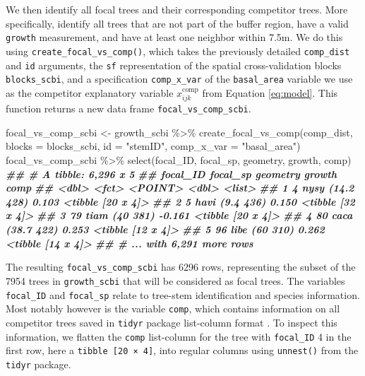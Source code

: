 \documentclass[12pt]{article}
\newenvironment{Shaded}{\begin{snugshade}}{\end{snugshade}}
\newcommand{\AttributeTok}[1]{\textcolor[rgb]{0.77,0.63,0.00}{#1}}
\newcommand{\DocumentationTok}[1]{\textcolor[rgb]{0.56,0.35,0.01}{\textbf{\textit{#1}}}}
\newcommand{\FunctionTok}[1]{\textcolor[rgb]{0.00,0.00,0.00}{#1}}
\newcommand{\NormalTok}[1]{#1}
\newcommand{\OtherTok}[1]{\textcolor[rgb]{0.56,0.35,0.01}{#1}}
\newcommand{\SpecialCharTok}[1]{\textcolor[rgb]{0.00,0.00,0.00}{#1}}
\newcommand{\StringTok}[1]{\textcolor[rgb]{0.31,0.60,0.02}{#1}}
\begin{document}
We then identify all focal trees and their corresponding competitor
trees. More specifically, identify all trees that are not part of the
buffer region, have a valid \texttt{growth} measurement, and have at
least one neighbor within 7.5m. We do this using
\texttt{create\_focal\_vs\_comp()}, which takes the previously detailed
\texttt{comp\_dist} and \texttt{id} arguments, the \texttt{sf}
representation of the spatial cross-validation blocks
\texttt{blocks\_scbi}, and a specification \texttt{comp\_x\_var} of the
\texttt{basal\_area} variable we use as the competitor explanatory
variable \(x^{\text{comp}}_{ijk}\) from Equation \ref{eq:model}. This
function returns a new data frame \texttt{focal\_vs\_comp\_scbi}.

\begin{Shaded}
\begin{Highlighting}[]
\NormalTok{focal\_vs\_comp\_scbi }\OtherTok{\textless{}{-}}\NormalTok{ growth\_scbi }\SpecialCharTok{\%\textgreater{}\%}
    \FunctionTok{create\_focal\_vs\_comp}\NormalTok{(comp\_dist, }\AttributeTok{blocks =}\NormalTok{ blocks\_scbi, }\AttributeTok{id =} \StringTok{"stemID"}\NormalTok{,}
        \AttributeTok{comp\_x\_var =} \StringTok{"basal\_area"}\NormalTok{)}
\NormalTok{focal\_vs\_comp\_scbi }\SpecialCharTok{\%\textgreater{}\%}
    \FunctionTok{select}\NormalTok{(focal\_ID, focal\_sp, geometry, growth, comp)}
\DocumentationTok{\#\# \# A tibble: 6,296 x 5}
\DocumentationTok{\#\#   focal\_ID focal\_sp   geometry growth comp             }
\DocumentationTok{\#\#      \textless{}dbl\textgreater{} \textless{}fct\textgreater{}       \textless{}POINT\textgreater{}  \textless{}dbl\textgreater{} \textless{}list\textgreater{}           }
\DocumentationTok{\#\# 1        4 nysy     (14.2 428)  0.103 \textless{}tibble [20 x 4]\textgreater{}}
\DocumentationTok{\#\# 2        5 havi      (9.4 436)  0.150 \textless{}tibble [32 x 4]\textgreater{}}
\DocumentationTok{\#\# 3       79 tiam       (40 381) {-}0.161 \textless{}tibble [20 x 4]\textgreater{}}
\DocumentationTok{\#\# 4       80 caca     (38.7 422)  0.253 \textless{}tibble [12 x 4]\textgreater{}}
\DocumentationTok{\#\# 5       96 libe       (60 310)  0.262 \textless{}tibble [14 x 4]\textgreater{}}
\DocumentationTok{\#\# \# ... with 6,291 more rows}
\end{Highlighting}
\end{Shaded}

The resulting \texttt{focal\_vs\_comp\_scbi} has 6296 rows, representing
the subset of the 7954 trees in \texttt{growth\_scbi} that will be
considered as focal trees. The variables \texttt{focal\_ID} and
\texttt{focal\_sp} relate to tree-stem identification and species
information. Most notably however is the variable \texttt{comp}, which
contains information on all competitor trees saved in \texttt{tidyr}
package list-column format \citep{tidyr_package}. To inspect this
information, we flatten the \texttt{comp} list-column for the tree with
\texttt{focal\_ID} 4 in the first row, here a
\texttt{tibble\ {[}20\ ×\ 4{]}}, into regular columns using
\texttt{unnest()} from the \texttt{tidyr} package.
\end{document}
